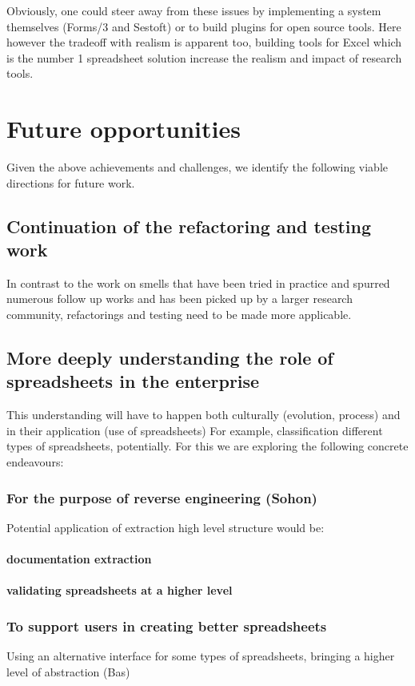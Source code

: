 \documentclass[conference]{IEEEtran}
\begin{document}
Obviously, one could steer away from these issues by implementing a system themselves (Forms/3 and Sestoft) or to build plugins for open source tools. Here however the tradeoff with realism is apparent too, building tools for Excel which is the number 1 spreadsheet solution increase the realism and impact of research tools.

\section{Future opportunities}
Given the above achievements  and challenges, we identify the following viable directions for future work.

\subsection{Continuation of the refactoring and testing work}
In contrast to the work on smells that have been tried in practice and spurred numerous follow up works and has been picked up by a larger research community, refactorings and testing need to be made more applicable.

\subsection{More deeply understanding the role of spreadsheets in the enterprise}
This understanding will have to happen both culturally (evolution, process) and in their application (use of spreadsheets) For example, classification different types of spreadsheets, potentially. For this we are exploring the following concrete endeavours:

\subsubsection{For the purpose of reverse engineering (Sohon)}
Potential application of extraction high level structure would be:
\paragraph{documentation extraction}
\paragraph{validating spreadsheets at a higher level}

\subsubsection{To support users in creating better spreadsheets}
Using  an alternative interface for some types of spreadsheets, bringing a higher level of abstraction (Bas)
\end{document}
